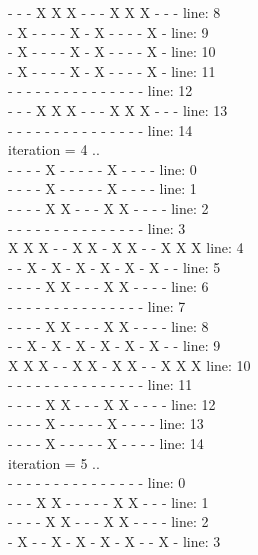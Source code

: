 \documentclass[a4paper, 14pt]{article}
\begin{document}
\begin{enumerate}
{ -  -  -  X  X  X  -  -  -  X  X  X  -  -  - 	line: 8\\
 -  X  -  -  -  -  X  -  X  -  -  -  -  X  - 	line: 9\\
 -  X  -  -  -  -  X  -  X  -  -  -  -  X  - 	line: 10\\
 -  X  -  -  -  -  X  -  X  -  -  -  -  X  - 	line: 11\\
 -  -  -  -  -  -  -  -  -  -  -  -  -  -  - 	line: 12\\
 -  -  -  X  X  X  -  -  -  X  X  X  -  -  - 	line: 13\\
 -  -  -  -  -  -  -  -  -  -  -  -  -  -  - 	line: 14\\
iteration = 4 ..\\
 -  -  -  -  X  -  -  -  -  -  X  -  -  -  - 	line: 0\\
 -  -  -  -  X  -  -  -  -  -  X  -  -  -  - 	line: 1\\
 -  -  -  -  X  X  -  -  -  X  X  -  -  -  - 	line: 2\\
 -  -  -  -  -  -  -  -  -  -  -  -  -  -  - 	line: 3\\
 X  X  X  -  -  X  X  -  X  X  -  -  X  X  X 	line: 4\\
 -  -  X  -  X  -  X  -  X  -  X  -  X  -  - 	line: 5\\
 -  -  -  -  X  X  -  -  -  X  X  -  -  -  - 	line: 6\\
 -  -  -  -  -  -  -  -  -  -  -  -  -  -  - 	line: 7\\
 -  -  -  -  X  X  -  -  -  X  X  -  -  -  - 	line: 8\\
 -  -  X  -  X  -  X  -  X  -  X  -  X  -  - 	line: 9\\
 X  X  X  -  -  X  X  -  X  X  -  -  X  X  X 	line: 10\\
 -  -  -  -  -  -  -  -  -  -  -  -  -  -  - 	line: 11\\
 -  -  -  -  X  X  -  -  -  X  X  -  -  -  - 	line: 12\\
 -  -  -  -  X  -  -  -  -  -  X  -  -  -  - 	line: 13\\
 -  -  -  -  X  -  -  -  -  -  X  -  -  -  - 	line: 14\\
\newpage
iteration = 5 ..\\
 -  -  -  -  -  -  -  -  -  -  -  -  -  -  - 	line: 0\\
 -  -  -  X  X  -  -  -  -  -  X  X  -  -  - 	line: 1\\
 -  -  -  -  X  X  -  -  -  X  X  -  -  -  - 	line: 2\\
 -  X  -  -  X  -  X  -  X  -  X  -  -  X  - 	line: 3\\
}
\end{enumerate}
\end{document}
